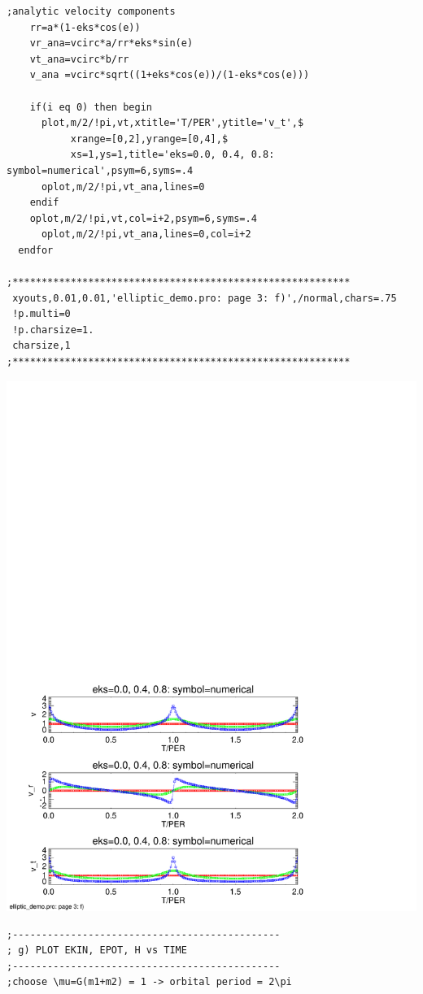 \documentclass[a4paper,12pt]{article}
\def\red{\color{red}}
\def\black{\color{RGBblack}}
\begin{document}
{{{{{\begin{verbatim}
;analytic velocity components
    rr=a*(1-eks*cos(e))    
    vr_ana=vcirc*a/rr*eks*sin(e)
    vt_ana=vcirc*b/rr
    v_ana =vcirc*sqrt((1+eks*cos(e))/(1-eks*cos(e)))
	
    if(i eq 0) then begin
      plot,m/2/!pi,vt,xtitle='T/PER',ytitle='v_t',$
           xrange=[0,2],yrange=[0,4],$
           xs=1,ys=1,title='eks=0.0, 0.4, 0.8: symbol=numerical',psym=6,syms=.4
      oplot,m/2/!pi,vt_ana,lines=0        
    endif
    oplot,m/2/!pi,vt,col=i+2,psym=6,syms=.4
      oplot,m/2/!pi,vt_ana,lines=0,col=i+2        
  endfor

;**********************************************************
 xyouts,0.01,0.01,'elliptic_demo.pro: page 3: f)',/normal,chars=.75
 !p.multi=0
 !p.charsize=1.
 charsize,1
;**********************************************************
\end{verbatim}}

\black

\vspace{-12cm}
\includegraphics[width=0.9\paperwidth]{elliptic_demo_3.pdf}
\clearpage
{\red \scriptsize \begin{verbatim}
;----------------------------------------------
; g) PLOT EKIN, EPOT, H vs TIME
;----------------------------------------------
;choose \mu=G(m1+m2) = 1 -> orbital period = 2\pi


\end{verbatim}}}}}}
\end{document}
